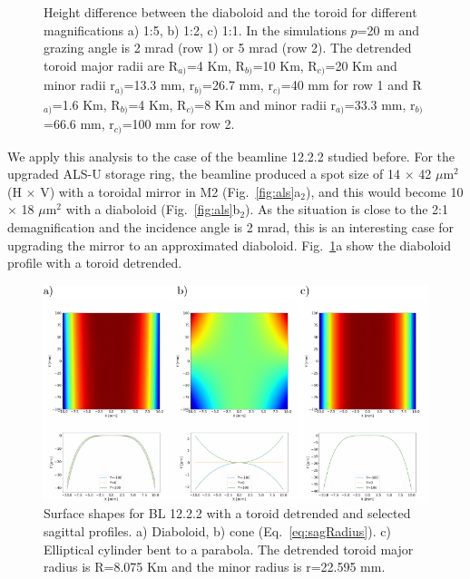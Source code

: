 \documentclass{iucr}              %
\begin{document}
\begin{figure}
\caption{
Height difference between the diaboloid and the toroid for different magnifications a) 1:5, b) 1:2, c) 1:1. In the simulations $p$=20 m and grazing angle is 2 mrad (row 1) or 5 mrad (row 2). The detrended toroid major radii are R$_{a)}$=4 Km, R$_{b)}$=10 Km, R$_{c)}$=20 Km and minor radii r$_{a)}$=13.3 mm, r$_{b)}$=26.7 mm, r$_{c)}$=40 mm for row 1 and R$_{a)}$=1.6 Km, R$_{b)}$=4 Km, R$_{c)}$=8 Km and minor radii r$_{a)}$=33.3 mm, r$_{b)}$=66.6 mm, r$_{c)}$=100 mm for row 2.
}
\end{figure}


We apply this analysis to the case of the beamline 12.2.2 studied before. For the upgraded ALS-U storage ring, the beamline produced a spot size of 14 $\times$ 42 $\mu$m$^2$ (H $\times$ V) with a toroidal mirror in M2 (Fig.~\ref{fig:als}a$_2$), and this would become 10 $\times$ 18 $\mu$m$^2$ with a diaboloid (Fig.~\ref{fig:als}b$_2$). As the situation is close to the 2:1 demagnification and the incidence angle is 2 mrad, this is an interesting case for upgrading the mirror to an approximated diaboloid. Fig.~\ref{fig:detrendedBeamline}a show the diaboloid profile with a toroid detrended. 

\begin{figure}\label{fig:detrendedBeamline}
\includegraphics[width=1.0\textwidth]{figures/fig8.pdf}
% 

\caption{Surface shapes for BL 12.2.2 with a toroid detrended and selected sagittal profiles.
a) Diaboloid, b) cone (Eq.~\ref{eq:sagRadius}). c) Elliptical cylinder bent to a parabola. The detrended toroid major radius is R=8.075 Km and the minor radius is  r=22.595 mm.
}
\end{figure}
\end{document}

